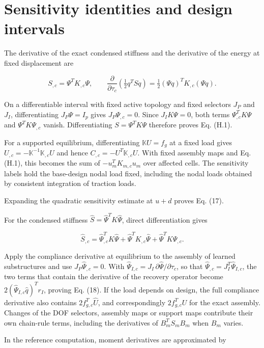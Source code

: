 \documentclass[preprint,12pt,authoryear]{elsarticle}
\begin{document}
\section{Sensitivity identities and design intervals}

The derivative of the exact condensed stiffness and the derivative of the energy at fixed displacement are

\[
S_{,c}=\Psi^TK_{,c}\Psi,\qquad
\frac{\partial}{\partial\tau_c}\left(\tfrac12q^TSq\right)
=\tfrac12(\Psi q)^TK_{,c}(\Psi q).
\tag{H.1}
\]

On a differentiable interval with fixed active topology and fixed selectors \(J_P\) and \(J_I\), differentiating \(J_P\Psi=I_p\) gives \(J_P\Psi_{,c}=0\). Since \(J_IK\Psi=0\), both terms \(\Psi_{,c}^TK\Psi\) and \(\Psi^TK\Psi_{,c}\) vanish. Differentiating \(S=\Psi^TK\Psi\) therefore proves Eq. (H.1).

For a supported equilibrium, differentiating \(\mathbb K U=f_g\) at a fixed load gives \(U_{,c}=-\mathbb K^{-1}\mathbb K_{,c}U\) and hence \(C_{,c}=-U^T\mathbb K_{,c}U\). With fixed assembly maps and Eq. (H.1), this becomes the sum of \(-u_m^TK_{m,c}u_m\) over affected cells. The sensitivity labels hold the base-design nodal load fixed, including the nodal loads obtained by consistent integration of traction loads.

Expanding the quadratic sensitivity estimate at \(u+d\) proves Eq. (17).

For the condensed stiffness \(\widehat S=\widehat\Psi^TK\widehat\Psi\), direct differentiation gives

\[
\widehat S_{,c}=\widehat\Psi_{,c}^TK\widehat\Psi+\widehat\Psi^TK_{,c}\widehat\Psi+\widehat\Psi^TK\widehat\Psi_{,c}.
\tag{H.2}
\]

Apply the compliance derivative at equilibrium to the assembly of learned substructures and use \(J_P\widehat\Psi_{,c}=0\). With \(\widehat\Psi_{I,c}=J_I\,\partial \widehat\Psi/\partial\tau_c\), so that \(\widehat\Psi_{,c}=J_I^T\widehat\Psi_{I,c}\), the two terms that contain the derivative of the recovery operator become \(2(\widehat\Psi_{I,c}\widehat q)^Tr_I\), proving Eq. (18). If the load depends on design, the full compliance derivative also contains \(2f_{g,c}^T\widehat U\), and correspondingly \(2f_{g,c}^TU\) for the exact assembly. Changes of the DOF selectors, assembly maps or support maps contribute their own chain-rule terms, including the derivatives of \(B_m^TS_mB_m\) when \(B_m\) varies.

In the reference computation, moment derivatives are approximated by
\end{document}
